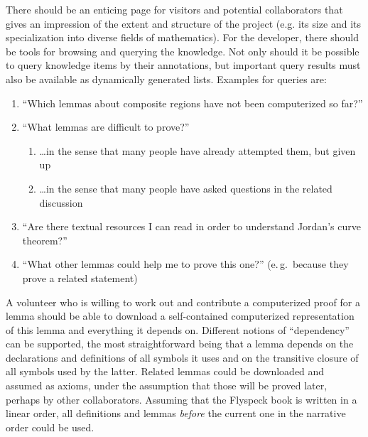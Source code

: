 There should be an enticing page for visitors and potential
collaborators that gives an impression of the extent and structure of
the project (e.g. its size and its specialization into diverse fields
of mathematics).  For the developer, there should be tools for
browsing and querying the knowledge.  Not only should it be possible
to query knowledge items by their annotations, but important query
results must also be available as dynamically generated lists.
Examples for queries are:

\begin{enumerate}
\item\label{item:proven-lemma} ``Which lemmas about composite regions have not
  been computerized so far?''
\item ``What lemmas are difficult to prove?''
  \begin{enumerate}
  \item \ldots in the sense that many people have already attempted them, but given up
  \item\label{item:question-count} \ldots in the sense that many people have asked
    questions in the related discussion
  \end{enumerate}
\item ``Are there textual resources I can read in order to understand Jordan's
  curve theorem?''
\item ``What other lemmas could help me to prove this one?'' (e.\,g.\ because
  they prove a related statement)
\end{enumerate}

A volunteer who is willing to work out and contribute a computerized proof for
a lemma should be able to download a self-contained computerized
representation of this lemma and everything it depends on.  Different
notions of ``dependency'' can be supported,
the most straightforward being that a lemma depends on the
declarations and definitions of all symbols it uses and on the transitive
closure of all symbols used by the latter.  Related lemmas
could be downloaded and assumed as axioms, under the assumption that
those will be proved later, perhaps by other collaborators.  
Assuming that the Flyspeck book is written in a
linear order, all definitions and lemmas \emph{before} the current one in the
narrative order could be used.


